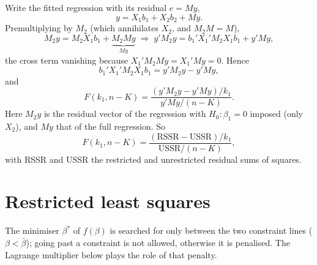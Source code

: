 \documentclass[11pt]{article}
\begin{document}
Write the fitted regression with its residual $e = My$,
\[ y = X_{1}b_{1} + X_{2}b_{2} + My. \]
Premultiplying by $M_{2}$ (which annihilates $X_{2}$, and $M_{2}M = M$),
\[ M_{2}y = M_{2}X_{1}b_{1} + \underbrace{M_{2}My}_{My}
   \;\Longrightarrow\;
   y'M_{2}y = b_{1}'X_{1}'M_{2}X_{1}b_{1} + y'My, \]
the cross term vanishing because $X_{1}'M_{2}My = X_{1}'My = 0$. Hence
\[ b_{1}'X_{1}'M_{2}X_{1}b_{1} = y'M_{2}y - y'My, \]
and
\[ F(k_{1}, n - K) = \frac{(y'M_{2}y - y'My)/k_{1}}{y'My/(n - K)}. \]
Here $M_{2}y$ is the residual vector of the regression with $H_{0} : \beta_{1} = 0$
imposed (only $X_{2}$), and $My$ that of the full regression. So
\[ F(k_{1}, n - K) = \frac{(\text{RSSR} - \text{USSR})/k_{1}}{\text{USSR}/(n - K)}, \]
with RSSR and USSR the restricted and unrestricted residual sums of squares.

\section{Restricted least squares}

\begin{center}
\end{center}
The minimiser $\beta^{*}$ of $f(\beta)$ is searched for only between the two constraint
lines ($\beta < \bar\beta$); going past a constraint is not allowed, otherwise it is
penalised. The Lagrange multiplier below plays the role of that penalty.
\end{document}
